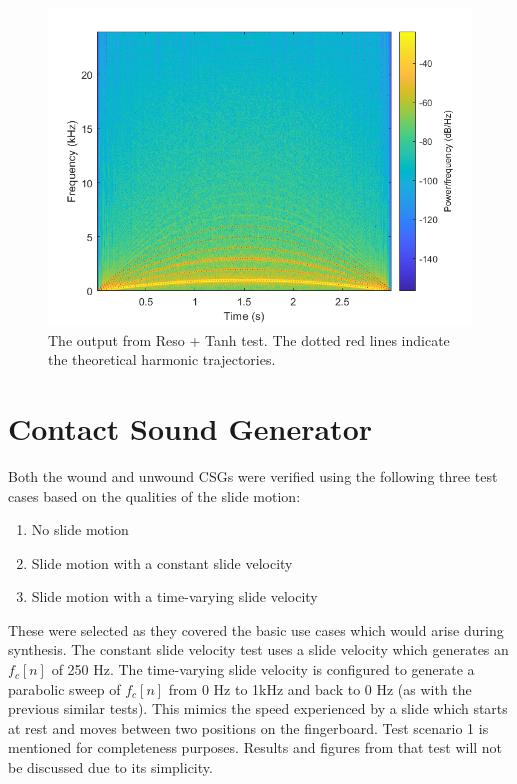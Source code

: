 \documentclass[../main.tex]{subfiles}
\begin{document}
\begin{figure}[h]
    \centering
    \includegraphics[scale=.65]{./images/plots/ResoTanhTest.png}
    \caption{The output from Reso + Tanh test. The dotted red lines indicate the theoretical harmonic trajectories.}
    \label{fig:ResoTanhTest}
\end{figure}

\section{Contact Sound Generator}
Both the wound and unwound CSGs were verified using the following three test cases based on the qualities of the slide motion:

\begin{enumerate}
    \item No slide motion
    \item Slide motion with a constant slide velocity
    \item Slide motion with a time-varying slide velocity
\end{enumerate}

These were selected as they covered the basic use cases which would arise during synthesis. The constant slide velocity test uses a slide velocity which generates an $f_c[n]$ of 250 Hz. The time-varying slide velocity is configured to generate a parabolic sweep of $f_c[n]$ from 0 Hz to 1kHz and back to 0 Hz (as with the previous similar tests). This mimics the speed experienced by a slide which starts at rest and moves between two positions on the fingerboard. Test scenario 1 is mentioned for completeness purposes. Results and figures from that test will not be discussed due to its simplicity.
\end{document}
